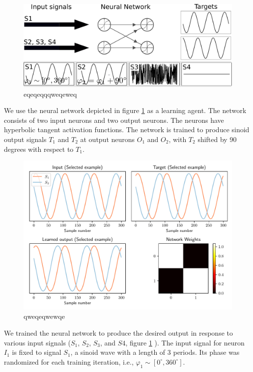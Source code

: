\documentclass[]{article}
\begin{document}
\begin{figure}
	\centering
	\includegraphics[width=1\linewidth]{neural_network}
	\caption{eqeqeqqqweqeweq}
	\label{fig:neuralnetwork}
\end{figure}

We use the neural network depicted in figure \ref{fig:neuralnetwork} as a learning agent. The network consists of two input neurons and two output neurons. The neurons have hyperbolic tangent activation functions. The network is trained to produce sinoid output signals $T_1$ and $T_2$ at output neurons $O_1$ and $O_2$, with $T_2$ shifted by 90 degrees with respect to $T_1$.

\begin{figure}
	\centering
	\includegraphics[width=1\linewidth]{neural_network_0}
	\caption{qweqeqwewqe}
	\label{fig:neuralnetwork0}
\end{figure}

We trained the neural network to produce the desired output in response to various input signals ($S_1$, $S_2$, $S_3$, and $S4$, figure \ref{fig:neuralnetwork} ). The input signal for neuron $I_1$ is fixed to signal $S_1$, a sinoid wave with a length of 3 periods. Its phase was randomized for each training iteration, i.e., $\varphi_1 \sim [0^\circ, 360^\circ]$.
\end{document}
